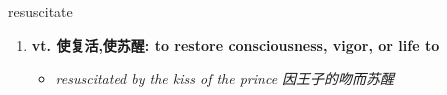 
\begin{frame}
{\huge resuscitate}
\begin{center}
\begin{enumerate}\Large
  \item \textbf{vt. 使复活,使苏醒: to restore consciousness, vigor, or life to}
  \begin{itemize}
    \item \em{\Large{resuscitated by the kiss of the prince 因王子的吻而苏醒}}
  \end{itemize}
\end{enumerate}
\end{center}
\end{frame}

